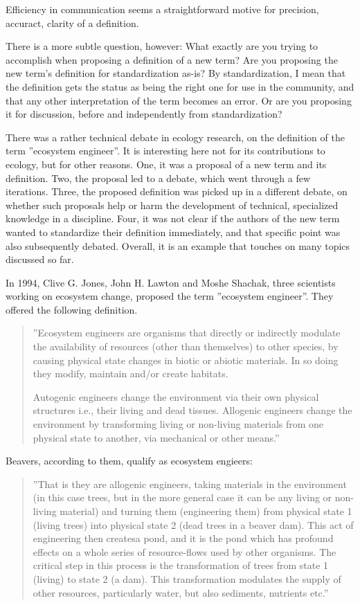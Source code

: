 \documentclass[graybox,envcountchap,sectrefs]{svmono}
\begin{document}
Efficiency in communication seems a straightforward motive for precision, accuract, clarity of a definition. 

There is a more subtle question, however: What exactly are you trying to accomplish when proposing a definition of a new term? Are you proposing the new term's definition for standardization as-is? By standardization, I mean that the definition gets the status as being the right one for use in the community, and that any other interpretation of the term becomes an error. Or are you proposing it for discussion, before and independently from standardization? 

There was a rather technical debate in ecology research, on the definition of the term ''ecosystem engineer''. It is interesting here not for its contributions to ecology, but for other reasons. One, it was a proposal of a new term and its definition. Two, the proposal led to a debate, which went through a few iterations. Three, the proposed definition was picked up in a different debate, on whether such proposals help or harm the development of technical, specialized knowledge in a discipline. Four, it was not clear if the authors of the new term wanted to standardize their definition immediately, and that specific point was also subsequently debated. Overall, it is an example that touches on many topics discussed so far.

In 1994, Clive G. Jones, John H. Lawton and Moshe Shachak, three scientists working on ecosystem change, proposed the term ''ecosystem engineer''. They offered the following definition.

\begin{quote}
  ''Ecosystem engineers are organisms that directly or indirectly modulate the availability of resources (other than themselves) to other species, by causing physical state changes in biotic or abiotic materials. In so doing they modify, maintain and/or create habitats. 
  
  Autogenic engineers change the environment via their own physical structures i.e., their living and dead tissues. Allogenic engineers change the environment by transforming living or non-living materials from one physical state to another, via mechanical or other means.'' \cite{jones1994organisms}
\end{quote}
Beavers, according to them, qualify as ecosystem engieers:
\begin{quote}
  ''That is they are allogenic engineers, taking materials in the environment (in this case trees, but in the more general case it can be any living or non-living material) and turning them (engineering them) from physical state 1 (living trees) into physical state 2 (dead trees in a beaver dam). This act of engineering then createsa pond, and it is the pond which has profound effects on a whole series of resource-flows used by other organisms. The critical step in this process is the transformation of trees from state 1 (living) to state 2 (a dam). This transformation modulates the supply of other resources, particularly water, but also sediments, nutrients etc.'' 
\end{quote} 
\end{document}
